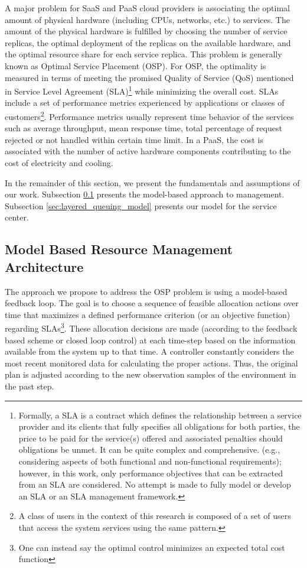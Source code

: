 \documentclass[11pt]{article}
\begin{document}
  A major problem for SaaS and PaaS cloud providers is associating the optimal amount of physical hardware (including CPUs, networks, etc.) to services. The amount of the physical hardware is fulfilled by choosing the number of service replicas, the optimal deployment of the replicas on the available hardware, and the optimal resource share for each service replica. This problem is generally known as Optimal Service Placement (OSP)\cite{zhang2012dynamicPlacement}. 
   For OSP, the optimality is measured in terms of meeting the promised Quality of Service (QoS) mentioned in Service Level Agreement (SLA)\footnote{Formally, a SLA is a contract which defines the relationship between a service provider and its clients that fully specifies all obligations for both parties, the price to be paid for the service(s) offered and associated penalties should obligations be unmet. It can be quite complex and comprehensive. (e.g., considering aspects of both functional and non-functional requirements); however, in this work, only performance objectives that can be extracted from an SLA are considered. No attempt is made to fully model or develop an SLA or an SLA management framework.} while minimizing the overall cost. SLAs include a set of performance metrics experienced by applications or classes of customers\footnote{A class of users in the context of this research is composed of a set of users that access the system services using the same pattern.}.
	Performance metrics usually represent time behavior of the services such as average throughput, mean response time, total percentage of request rejected or not handled within certain time limit. 
	In a PaaS, the cost is associated with the number of active hardware components contributing to the cost of electricity and cooling. 

In the remainder of this section, we present the fundamentals and assumptions of our work. Subsection \ref{sec:model_based_resource_management_architecture} presents the model-based approach to management. Subsection \ref{sec:layered_queuing_model} presents our model for the service center.
 
\subsection{Model Based Resource Management Architecture}  
\label{sec:model_based_resource_management_architecture}
 The approach we propose to address the OSP problem is using a model-based feedback loop.
 The goal is to choose a sequence of feasible allocation actions over time that maximizes a defined performance criterion (or an objective function) regarding SLAs\footnote{One can instead say the optimal control minimizes an expected total cost function}.
These allocation decisions are made (according to the feedback based scheme or closed loop control) at each time-step based on the information available from the system up to that time.
 A controller constantly considers the most recent monitored data for calculating the proper actions. Thus, the original plan is adjusted according to the new observation samples of the environment in the past step. 
\end{document}
